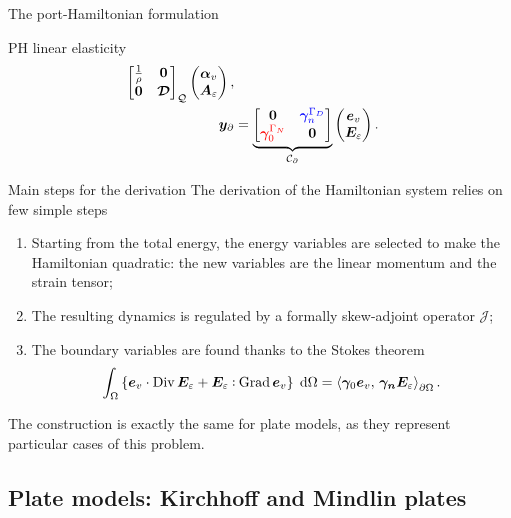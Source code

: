 \documentclass[aspectratio=169]{ISAE-Beamer}
\DeclareMathOperator*{\Grad}{Grad}
\DeclareMathOperator*{\Div}{Div}
\newcommand{\inner}[3][]{\ensuremath{\left\langle #2, \, #3 \right\rangle_{#1}}}
\def\onedot{$\mathsurround0pt\ldotp$}
\def\cddot{%
	\mathbin{\vcenter{\baselineskip.67ex
			\hbox{\onedot}\hbox{\onedot}}%
}}
\begin{document}
\begin{frame}{The port-Hamiltonian formulation}
\begin{block}{PH linear elasticity}
\begin{equation*}
\begin{aligned}
{		\begin{bmatrix}
		\frac{1}{\rho} & \bm{0} \\
		\bm{0} & \bm{\mathcal{D}} \\
		\end{bmatrix}}_{\mathcal{Q}}
	\begin{pmatrix}
	\bm{\alpha}_v \\
	\bm{A}_\varepsilon
	\end{pmatrix}, \\
	\bm{y}_\partial &= \underbrace{
		\begin{bmatrix}
		\bm{0} & \textcolor{blue}{\bm\gamma_{n}^{\Gamma_D}} \\
		\textcolor{red}{\bm\gamma_0^{\Gamma_N}} & \bm{0} \\
		\end{bmatrix}}_{\mathcal{C}_\partial}
	\begin{pmatrix}
	\bm{e}_v \\
	\bm{E}_\varepsilon
	\end{pmatrix}.
	\end{aligned}
	\end{equation*}
	\end{block}
\end{frame}

\begin{frame}{Main steps for the derivation}
The derivation of the Hamiltonian system relies on few simple steps  
\begin{enumerate}
\item Starting from the total energy, the energy variables are selected to make the Hamiltonian quadratic: the new variables are the linear momentum and the strain tensor;
\item The resulting dynamics is regulated by a formally skew-adjoint operator $\mathcal{J}$;
\item The boundary variables are found thanks to the Stokes theorem
\[
\int_{\Omega} \left\{\bm{e}_v \cdot \Div \bm{E}_\varepsilon + \bm{E}_\varepsilon \cddot \Grad \bm{e}_v \right\}\d\Omega = \inner[\partial\Omega]{\bm{\gamma}_0\bm{e}_v}{\bm{\gamma_n}\bm{E}_\varepsilon}.
\]
\end{enumerate}

The construction is exactly the same for plate models, as they represent particular cases of this problem.
\end{frame}

\subsection{Plate models: Kirchhoff and Mindlin plates}
\end{document}
